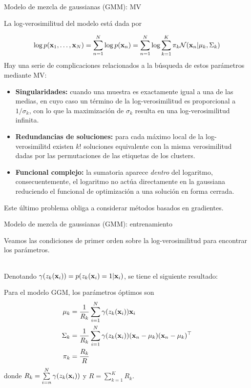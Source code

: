 \documentclass[9pt]{beamer}
\begin{document}
\begin{frame}{Modelo de mezcla de gaussianas (GMM): MV}
	
 La log-verosimilitud del modelo está dada por 

\begin{equation*}
	\log p(\mathbf{x}_1,\ldots,\mathbf{x}_N) = \sum_{n=1}^N \log p(\mathbf{x}_n) = \sum_{n=1}^N \log \sum_{k=1}^K  \pi_k{\mathcal N}(\mathbf{x}_n|\mu_k,\Sigma_k) \label{eq:GMM_like}	
\end{equation*}\pause
Hay una serie de complicaciones relacionados a la búsqueda de estos parámetros mediante MV:

\begin{itemize}
	\item \textbf{Singularidades:} cuando una muestra es exactamente igual a una de las medias, en cuyo caso un término de la log-verosimilitud es proporcional a $1/\sigma_k$, con lo que la maximización de $\sigma_k$ resulta en una log-verosimilitud infinita.\pause
	\item \textbf{Redundancias de soluciones:} para cada máximo local de la log-verosimilitd existen $k!$ soluciones equivalente con la misma verosimilitud dadas por las permutaciones de las etiquetas de los clusters.\pause
	\item \textbf{Funcional complejo:} la sumatoria aparece \emph{dentro} del logaritmo, consecuentemente, el logaritmo no actúa directamente en la gaussiana reduciendo el funcional de optimización a una solución en forma cerrada.
\end{itemize}

Este último problema obliga a considerar métodos basados en gradientes.

\end{frame}


\begin{frame}{Modelo de mezcla de gaussianas (GMM): entrenamiento}
	
Veamos las condiciones de primer orden sobre la log-verosimilitud para encontrar los parámetros.\\~\

Denotando $\gamma(z_k(\mathbf{x}_i)) = p(z_k(\mathbf{x}_i)=1|\mathbf{x}_i)$, se tiene el siguiente resultado:

\begin{lemma} Para el modelo GGM, los parámetros óptimos son
	\begin{align*}
    \mu_k & = \frac{1}{R_k}\sum_{i=1}^N \gamma(z_k(\mathbf{x}_i))\mathbf{x}_i\\
    \Sigma_k & = \frac{1}{R_k} \sum_{i=1}^N \gamma(z_k(\mathbf{x}_i))(\mathbf{x}_n - \mu_k)(\mathbf{x}_n - \mu_k)^\top\\
    \pi_k & = \frac{R_k}{R}
    \end{align*}
    donde $R_k = \sum\limits_{i=n}^N \gamma(z_k(\mathbf{x}_i))$ y $R = \sum\limits_{k=1}^K R_k$.
\end{lemma}
	
\end{frame}
\end{document}

